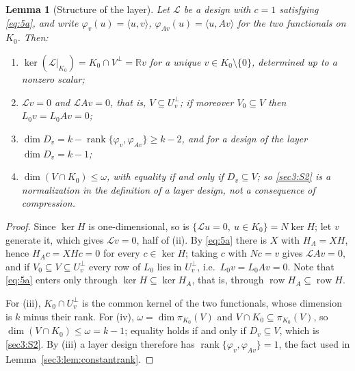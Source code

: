 \documentclass[journal]{IEEEtran}
\theoremstyle{plainn}
\newtheorem{lem}[thm]{Lemma}
\theoremstyle{remark}
\newcommand{\row}{\operatorname{row}}
\newcommand{\rank}{\operatorname{rank}}
\begin{document}
\begin{lem}[Structure of the layer]
\label{sec3:lem:direction}
\label{sec3:lem:Dv}
\label{sec3:rem:omega}
Let $\mathcal{L}$ be a design with $c=1$ satisfying \eqref{eq:5a}, and write
$\varphi_v(u)=\langle u,v\rangle$, $\varphi_{Av}(u)=\langle u,Av\rangle$ for the two functionals on
$K_0$. Then:
\begin{enumerate}[label=(\roman*),leftmargin=*,itemsep=1pt,topsep=2pt]
\item $\ker(\mathcal{L}|_{K_0})=K_0\cap V^\perp=\mathbb{R} v$ for a unique
$v\in K_0\setminus\{0\}$, determined up to a nonzero scalar;
\item $\mathcal{L}v=0$ and $\mathcal{L}Av=0$, that is, $V\subseteq U_v^\perp$; if moreover
$V_0\subseteq V$ then $L_0v=L_0Av=0$;
\item $\dim D_v=k-\rank\{\varphi_v,\varphi_{Av}\}\ge k-2$, and for a design of the layer
$\dim D_v=k-1$;
\item $\dim(V\cap K_0)\le\omega$, with equality if and only if $D_v\subseteq V$; so \ref{sec3:S2} is a
normalization in the definition of a layer design, not a consequence of compression.
\end{enumerate}
\end{lem}
\begin{proof}
Since $\ker H$ is one-dimensional, so is $\{\mathcal{L}u=0,\ u\in K_0\}=N\ker H$; let $v$ generate it,
which gives $\mathcal{L}v=0$, half of (ii). By \eqref{eq:5a} there is $X$ with $H_A=XH$, hence
$H_Ac=XHc=0$ for every $c\in\ker H$; taking $c$ with $Nc=v$ gives $\mathcal{L}Av=0$, and if
$V_0\subseteq V\subseteq U_v^\perp$ every row of $L_0$ lies in $U_v^\perp$, i.e.\ $L_0v=L_0Av=0$.
Note that \eqref{eq:5a} enters only through $\ker H\subseteq\ker H_A$, that is, through
$\row H_A\subseteq\row H$.

For (iii), $K_0\cap U_v^\perp$ is the common kernel of the two functionals, whose dimension is $k$
minus their rank. For (iv), $\omega=\dim\pi_{K_0}(V)$ and $V\cap K_0\subseteq\pi_{K_0}(V)$, so
$\dim(V\cap K_0)\le\omega=k-1$; equality holds if and only if $D_v\subseteq V$, which is
\ref{sec3:S2}. By (iii) a layer design therefore has $\rank\{\varphi_v,\varphi_{Av}\}=1$, the fact used in Lemma~\ref{sec3:lem:constantrank}.
\end{proof}
\end{document}
